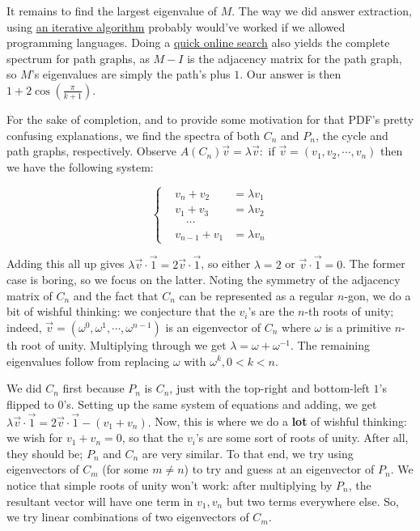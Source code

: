 \begin{solution}
    It remains to find the largest eigenvalue of $M$. The way we did answer extraction, using 
    \href{https://en.wikipedia.org/wiki/Rayleigh_quotient_iteration}{an iterative algorithm} 
    probably would've worked if we allowed programming languages. Doing a \href{https://www.win.tue.nl/~aeb/2WF02/spectra.pdf}{quick online search} 
    also yields the complete spectrum for path graphs, as $M - I$ is the adjacency matrix for 
    the path graph, so $M$'s eigenvalues are simply the path's plus $1$. Our answer is then 
    $\boxed{1 + 2\cos\left(\frac{\pi}{k + 1}\right)}$. \medskip

    For the sake of completion, and to provide some motivation for that PDF's pretty confusing explanations, 
    we find the spectra of both $C_n$ and $P_n$, the cycle and path graphs, respectively. 
    Observe $A\left(C_n\right)\vec v = \lambda\vec v:$ if $\vec v = \left(v_1, v_2, \cdots , v_n\right)$ 
    then we have the following system: 

    $$\left\{ \begin{aligned}
        &v_n + v_2 &= \lambda v_1 \\
        &v_1 + v_3 &= \lambda v_2 \\ 
        &\quad\cdots \\
        &v_{n - 1} + v_1 &= \lambda v_n
    \end{aligned} \right.$$

    Adding this all up gives $\lambda \vec v \cdot \vec 1 = 2\vec v \cdot \vec 1$, so either 
    $\lambda = 2$ or $\vec v \cdot \vec 1 = 0$. The former case is boring, so we focus on 
    the latter. Noting the symmetry of the adjacency matrix of $C_n$ and the fact that $C_n$ 
    can be represented as a regular $n$-gon, we do a bit of wishful thinking: we conjecture 
    that the $v_i$'s are the $n$-th 
    roots of unity; indeed, $\vec v = \left(\omega^0, \omega^1, \cdots , \omega^{n - 1}\right)$ 
    is an eigenvector of $C_n$ where $\omega$ is a primitive $n$-th root of unity. Multiplying 
    through we get $\lambda = \omega + \omega^{-1}$. The remaining eigenvalues follow from 
    replacing $\omega$ with $\omega^k, 0 < k < n$. \medskip

    We did $C_n$ first because $P_n$ is $C_n$, just with the top-right and bottom-left $1$'s 
    flipped to $0$'s. Setting up the same system of equations and adding, we get 
    $\lambda\vec v \cdot \vec 1 = 2\vec v \cdot \vec 1 - \left(v_1 + v_n\right).$ Now, this is 
    where we do a \textbf{lot} of wishful thinking: we wish for $v_1 + v_n = 0$, so that the $v_i$'s are 
    some sort of roots of unity. After all, they should be; $P_n$ and $C_n$ are very similar. 
    To that end, we try using eigenvectors of $C_m$ (for some $m \neq n$) to try and guess at 
    an eigenvector of $P_n$. We notice that simple roots of unity won't work: after multiplying 
    by $P_n$, the resultant vector will have one term in $v_1, v_n$ but two terms everywhere else. 
    So, we try linear combinations of two eigenvectors of $C_m$. \medskip
    

\end{solution}
